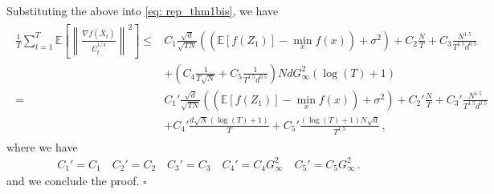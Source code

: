 \documentclass[anon,12pt]{colt2021} %
\begin{document}
Substituting the above into \eqref{eq: rep_thm1bis}, we have 
\begin{align}\label{eq: sub_thm1bis}
\begin{split}
	 \frac{1}{T}\sum_{t=1}^T  \mathbb E \left [\left\|\frac{\nabla f( \overline X_{t})}{\overline U_{t}^{1/4}}\right\|^2  \right] 
	\leq  & C_1 \frac{\sqrt{d}}{\sqrt{TN}} \left(( \mathbb E  [f( Z_{1})]  -  \min_x  f(x)) +    \sigma^2 \right)  +  C_2 \frac{N}{T}  +  C_3 \frac{N^{1.5}}{T^{1.5}d^{0.5}} 
	\nonumber \\
    &+  \left(C_4 \frac{1}{T\sqrt{N}} +  C_5   \frac{1}{T^{1.5}d^{0.5}}\right) 
NdG_{\infty}^2 (\log(T)+1)\\
	=  & C_1' \frac{\sqrt{d}}{\sqrt{TN}} \left(( \mathbb E  [f( Z_{1})]  -  \min_x  f(x)) +    \sigma^2 \right)  +  C_2' \frac{N}{T}  +  C_3' \frac{N^{1.5}}{T^{1.5}d^{0.5}} 
	\nonumber \\
    &+  C_4' \frac{d\sqrt{N}(\log(T)+1)}{T} +  C_5'   \frac{(\log(T)+1)N\sqrt{d}}{T^{1.5}}\,,
\end{split}
\end{align}
where we have 
\begin{align}
C_1' = C_1 \quad C_2' = C_2 \quad C_3' = C_3 \quad C_4' = C_4G_{\infty}^2 \quad C_5' = C_5 G_{\infty}^2 \, .
\end{align}
and we conclude the proof. \hfill $\square$
\end{document}

